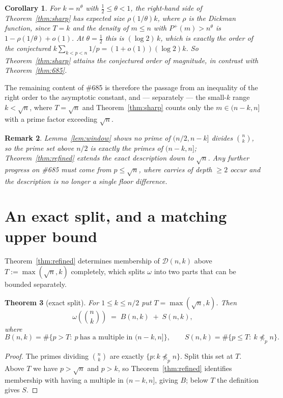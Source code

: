 \documentclass[11pt]{article}
\newtheorem{theorem}{Theorem}
\newtheorem{corollary}[theorem]{Corollary}
\newtheorem{remark}[theorem]{Remark}
\begin{document}
\begin{corollary}\label{cor:order}
For $k=n^{\theta}$ with $\tfrac12\le\theta<1$, the right-hand side of
Theorem~\ref{thm:sharp} has expected size $\rho\!\left(1/\theta\right)k$, where $\rho$ is the
Dickman function, since $T=k$ and the density of $m\le n$ with $P^{+}(m)>n^{\theta}$ is
$1-\rho(1/\theta)+o(1)$.  At $\theta=\tfrac12$ this is $(\log 2)\,k$, which is exactly the
order of the conjectured $k\sum_{k<p<n}1/p=(1+o(1))(\log2)k$.  So
Theorem~\ref{thm:sharp} attains the conjectured order of magnitude, in contrast with
Theorem~\ref{thm:685}.
\end{corollary}

The remaining content of \#685 is therefore the passage from an inequality of the right order
to the asymptotic constant, and --- separately --- the small-$k$ range $k<\sqrt n$, where
$T=\sqrt n$ and Theorem~\ref{thm:sharp} counts only the $m\in(n-k,n]$ with a prime factor
exceeding $\sqrt n$.

\begin{remark}
Lemma~\ref{lem:window} shows no prime of $(n/2,n-k]$ divides $\binom nk$, so the prime set
above $n/2$ is \emph{exactly} the primes of $(n-k,n]$; Theorem~\ref{thm:refined} extends the
exact description down to $\sqrt n$.  Any further progress on \#685 must come from
$p\le\sqrt n$, where carries of depth $\ge2$ occur and the description is no longer a single
floor difference.
\end{remark}

\section{An exact split, and a matching upper bound}

Theorem~\ref{thm:refined} determines membership of $\mathcal D(n,k)$ above
$T:=\max(\sqrt n,k)$ completely, which splits $\omega$ into two parts that can be bounded
separately.

\begin{theorem}[exact split]\label{thm:split}
For $1\le k\le n/2$ put $T=\max(\sqrt n,k)$.  Then
\[
  \omega\!\left(\binom nk\right)\;=\;B(n,k)\;+\;S(n,k),
\]
where
\[
  B(n,k)=\#\bigl\{p>T:\ p\ \text{has a multiple in }(n-k,n]\bigr\},\qquad
  S(n,k)=\#\bigl\{p\le T:\ k\not\preceq_p n\bigr\}.
\]
\end{theorem}

\begin{proof}
The primes dividing $\binom nk$ are exactly $\{p:k\not\preceq_pn\}$.  Split this set at $T$.
Above $T$ we have $p>\sqrt n$ and $p>k$, so Theorem~\ref{thm:refined} identifies membership
with having a multiple in $(n-k,n]$, giving $B$; below $T$ the definition gives $S$.
\end{proof}
\end{document}
